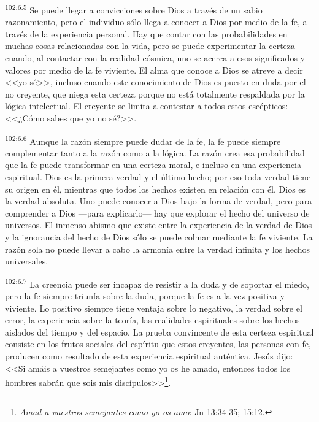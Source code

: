 \documentclass[twoside, 11pt]{book}
\begin{document}
\par
\textsuperscript{102:6.5} Se puede llegar a convicciones sobre Dios a través de un sabio razonamiento, pero el individuo sólo llega a conocer a Dios por medio de la fe, a través de la experiencia personal. Hay que contar con las probabilidades en muchas cosas relacionadas con la vida, pero se puede experimentar la certeza cuando, al contactar con la realidad cósmica, uno se acerca a esos significados y valores por medio de la fe viviente. El alma que conoce a Dios se atreve a decir <<yo sé>>, incluso cuando este conocimiento de Dios es puesto en duda por el no creyente, que niega esta certeza porque no está totalmente respaldada por la lógica intelectual. El creyente se limita a contestar a todos estos escépticos: <<¿Cómo sabes que yo no sé?>>.

\par
\textsuperscript{102:6.6} Aunque la razón siempre puede dudar de la fe, la fe puede siempre complementar tanto a la razón como a la lógica. La razón crea esa probabilidad que la fe puede transformar en una certeza moral, e incluso en una experiencia espiritual. Dios es la primera verdad y el último hecho; por eso toda verdad tiene su origen en él, mientras que todos los hechos existen en relación con él. Dios es la verdad absoluta. Uno puede conocer a Dios bajo la forma de verdad, pero para comprender a Dios ---para explicarlo--- hay que explorar el hecho del universo de universos. El inmenso abismo que existe entre la experiencia de la verdad de Dios y la ignorancia del hecho de Dios sólo se puede colmar mediante la fe viviente. La razón sola no puede llevar a cabo la armonía entre la verdad infinita y los hechos universales.

\par
\textsuperscript{102:6.7} La creencia puede ser incapaz de resistir a la duda y de soportar el miedo, pero la fe siempre triunfa sobre la duda, porque la fe es a la vez positiva y viviente. Lo positivo siempre tiene ventaja sobre lo negativo, la verdad sobre el error, la experiencia sobre la teoría, las realidades espirituales sobre los hechos aislados del tiempo y del espacio. La prueba convincente de esta certeza espiritual consiste en los frutos sociales del espíritu que estos creyentes, las personas con fe, producen como resultado de esta experiencia espiritual auténtica. Jesús dijo: <<Si amáis a vuestros semejantes como yo os he amado, entonces todos los hombres sabrán que sois mis discípulos>>\footnote{\textit{Amad a vuestros semejantes como yo os amo}: Jn 13:34-35; 15:12.}.
\end{document}
